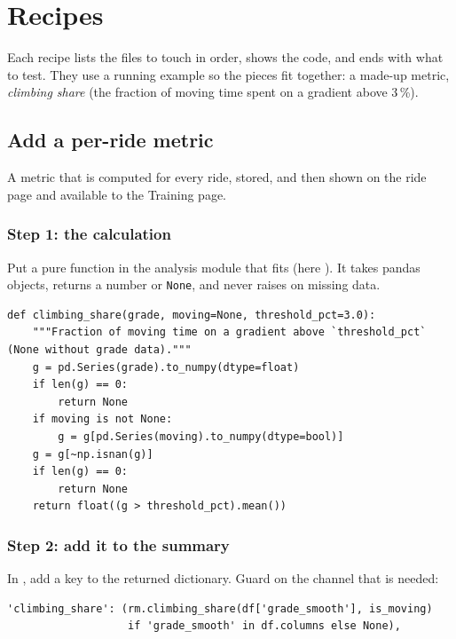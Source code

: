 \chapter{Recipes}

Each recipe lists the files to touch in order, shows the code, and ends with what to test. They use a running
example so the pieces fit together: a made-up metric, \emph{climbing share} (the fraction of moving time spent on
a gradient above 3\,\%).

\section{Add a per-ride metric}\label{rec:metric}

A metric that is computed for every ride, stored, and then shown on the ride page and available to the Training page.

\subsection*{Step 1: the calculation}

Put a pure function in the analysis module that fits (here ). It takes pandas
objects, returns a number or \texttt{None}, and never raises on missing data.

\begin{lstlisting}
def climbing_share(grade, moving=None, threshold_pct=3.0):
    """Fraction of moving time on a gradient above `threshold_pct` (None without grade data)."""
    g = pd.Series(grade).to_numpy(dtype=float)
    if len(g) == 0:
        return None
    if moving is not None:
        g = g[pd.Series(moving).to_numpy(dtype=bool)]
    g = g[~np.isnan(g)]
    if len(g) == 0:
        return None
    return float((g > threshold_pct).mean())
\end{lstlisting}

\subsection*{Step 2: add it to the summary}

In , add a key to the returned dictionary. Guard on the channel that is needed:

\begin{lstlisting}
'climbing_share': (rm.climbing_share(df['grade_smooth'], is_moving)
                   if 'grade_smooth' in df.columns else None),
\end{lstlisting}

